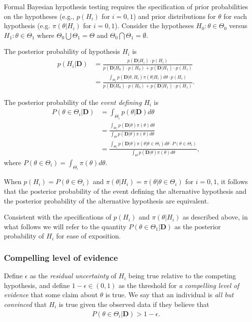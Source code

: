 \documentclass[12pt]{article}
\begin{document}
Formal Bayesian hypothesis testing requires the specification of prior probabilities on the hypotheses (e.g., $p(H_i)$ for $i=0,1$)
and prior distributions for $\theta$ for each hypothesis (e.g. $\pi\left(\theta \big| H_i\right)$ for $i=0,1$). 
%
Consider the hypotheses $H_0:\theta\in\Theta_{0}$ versus $H_1:\theta\in\Theta_{1}$ where $\Theta_{0}\bigcup \Theta_{1} = \Theta$ and $\Theta_{0} \bigcap \Theta_{1} = \emptyset$. 

The posterior probability of hypothesis $H_i$ is 
\begin{align}
p(H_i|\mathbf{D})&=\frac{p(\mathbf{D}|H_i)\cdot p(H_i)}{p(\mathbf{D}|H_0)\cdot p(H_0)+p(\mathbf{D}|H_1)\cdot p(H_1)}\\
&=\frac{\int_{\Theta_i} p(\mathbf{D}|\theta,H_i)\pi(\theta|H_i)d\theta\cdot p(H_i)}{p(\mathbf{D}|H_0)\cdot p(H_0)+p(\mathbf{D}|H_1)\cdot p(H_1)}.
\end{align}

The posterior probability of the \textit{event defining $H_i$} is
\begin{align}\label{eq:equation1}
P(\theta\in\Theta_i|\mathbf{D})
&=\int_{\Theta_i}p(\theta|\mathbf{D})d\theta\\
&=\frac{\int_{\Theta_i}p(\mathbf{D}|\theta)\pi (\theta)d\theta}{\int_{\Theta}p(\mathbf{D}|\theta)\pi(\theta) d\theta}\\
&=\frac{\int_{\Theta_i}p(\mathbf{D}|\theta)\pi (\theta|\theta\in\Theta_i)d\theta\cdot P(\theta\in\Theta_i)}{\int_{\Theta}p(\mathbf{D}|\theta)\pi(\theta) d\theta},
\end{align}
where $P(\theta\in\Theta_i)=\int_{\Theta_i}\pi(\theta)d\theta$. 

When $p(H_i) =P(\theta\in\Theta_i)$ and 
$\pi\left(\theta \big| H_i\right) = \pi\left(\theta\big|\theta \in \Theta_i\right)$ for $i=0,1$,
it follows that the posterior probability of the event defining the alternative hypothesis and the posterior
probability of the alternative hypothesis are equivalent. 

Consistent with the specifications of $p(H_i)$ and $\pi\left(\theta \big| H_i\right)$ as described above, in what follows we will refer to 
the quantity $P(\theta\in\Theta_1|\mathbf{D})$ as the posterior probability of $H_i$ for ease of exposition.

\subsubsection{Compelling level of evidence}
Define $\epsilon$ as the \textit{residual uncertainty} of $H_i$ being true relative to the competing hypothesis, and define $1-\epsilon\in(0,1)$ as the threshold for \textit{a compelling level of evidence} that some claim about $\theta$ is true. We say that an individual is \textit{all but convinced} that $H_i$ is true given the observed data if they believe that
\begin{align}\label{eq:compellingevidence}
P(\theta\in\Theta_i|\mathbf{D})> 1-\epsilon.
\end{align} 
\end{document}
